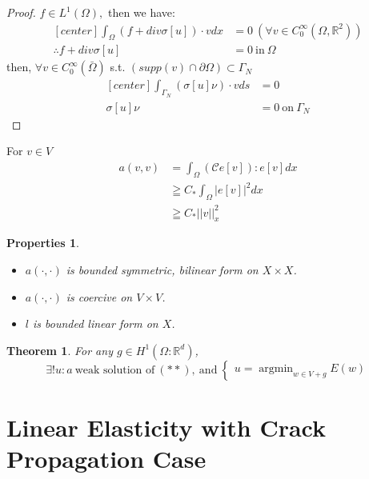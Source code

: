 \documentclass[a4paper,11pt]{article}
\newtheorem{prop}{Properties}
\newtheorem{theorem}{Theorem}
\newcommand{\R}{\mathbb{R}}
\newcommand{\Cmod}{\mathcal{C}}
\DeclareMathOperator*{\argmin}{argmin}
\begin{document}
\begin{proof}
	$f \in L^1(\Omega),$ then we have:
	\begin{equation*}
	\begin{aligned}[center]
	\int_\Omega (f + div \sigma[u]) \cdot v dx &= 0\ (\forall v \in C_0^\infty(\Omega,\R^2))\\
	\therefore f + div \sigma[u] &= 0\ \text{in}\ \Omega
	\end{aligned}
	\end{equation*}
	then, $\forall v \in C_0^\infty (\bar{\Omega})$ s.t. $(supp(v) \cap \partial\Omega) \subset \Gamma_N$
	\begin{equation*}
	\begin{aligned}[center]
	\int_{\Gamma_N} (\sigma[u]\nu)\cdot v ds &= 0\\
	\sigma[u]\nu &= 0\ \text{on}\ \Gamma_N
	\end{aligned}
	\end{equation*}
\end{proof}
For $v \in V$
\begin{equation*}
\begin{aligned}
a(v,v) &= \int_\Omega (\Cmod e[v]) : e[v] dx\\
&\geqq C_* \int_\Omega |e[v]|^2 dx\\
&\geqq C_* ||v||^2_x
\end{aligned}
\end{equation*}
\begin{prop}
	\begin{itemize}
		\item $a(\cdot,\cdot)$ is bounded symmetric, bilinear form on $X \times X$.
		\item $a(\cdot,\cdot)$ is coercive on $V \times V$.
		\item $l$ is bounded linear form on $X$.
	\end{itemize}
\end{prop}
\begin{theorem}
	For any $g\in H^1(\Omega : \R^d)$,
	\begin{equation*}
	\exists! u:a\ \text{weak solution of}\ (**),\ \text{and}\ \begin{cases}
	u=\argmin_{w\in V+g}E(w)
	\end{cases}
	\end{equation*}
\end{theorem}

\iffalse
\section{Linear Elasticity with Crack Propagation Case}
\end{document}

